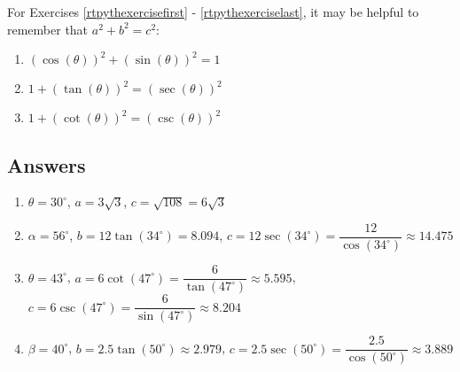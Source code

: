\documentclass{ximera}
\begin{document}
For Exercises \ref{rtpythexercisefirst} - \ref{rtpythexerciselast}, it may be helpful to remember that $a^2+b^2 = c^2$:

\begin{multicols}{3}

\begin{enumerate}

\setcounter{enumi}{\value{HW}}

\item  $(\cos(\theta))^2 + (\sin(\theta))^2 = 1$ \label{rtpythexercisefirst}

\item  $1 + (\tan(\theta))^2 = (\sec(\theta))^2$

\item  $ 1 + (\cot(\theta))^2 = (\csc(\theta))^2$ \label{rtpythexerciselast} \label{rtidentitylast}

\setcounter{HW}{\value{enumi}}

\end{enumerate}

\end{multicols}

\newpage

\subsection{Answers}

\begin{enumerate}



\item  $\theta = 30^{\circ}$, $a = 3\sqrt{3}$, $c = \sqrt{108} = 6\sqrt{3}$

\item  $\alpha = 56^{\circ}$, $b = 12 \tan(34^{\circ}) =  8.094$, $c = 12\sec(34^{\circ}) = \dfrac{12}{\cos(34^{\circ})} \approx 14.475$

\item  $\theta = 43^{\circ}$, $a = 6\cot(47^{\circ}) = \dfrac{6}{\tan(47^{\circ})} \approx 5.595$, $c = 6\csc(47^{\circ}) = \dfrac{6}{\sin(47^{\circ})} \approx 8.204$

\item  $\beta = 40^{\circ}$, $b = 2.5 \tan(50^{\circ}) \approx 2.979$, $c = 2.5\sec(50^{\circ}) = \dfrac{2.5}{\cos(50^{\circ})} \approx 3.889$

\setcounter{HW}{\value{enumi}}

\end{enumerate}
\end{document}
